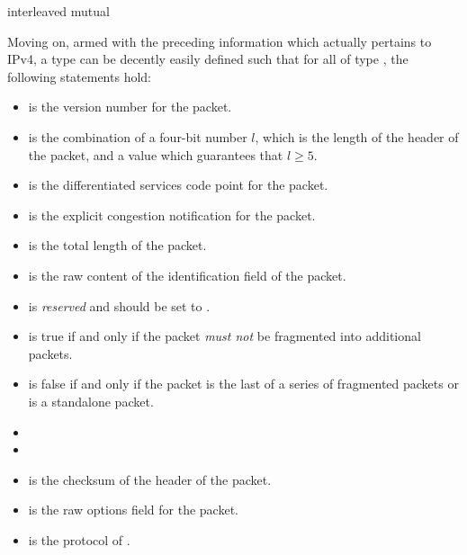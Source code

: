 \documentclass{report}
\begin{document}
\begin{itemize}
\begin{code}
  interleaved mutual
\end{code}

Moving on, armed with the preceding information which actually pertains to IPv4, a type  can be decently easily defined such that for all  of type , the following statements hold:
\begin{itemize}
	\item {}  is the version number for the  packet.
	\item {}  is the combination of a four-bit number \(l\), which is the length of the header of the  packet, and a value which guarantees that \(l \geq 5\).
	\item {}  is the differentiated services code point for the  packet.
	\item {}  is the explicit congestion notification for the  packet.
	\item {}  is the total length of the  packet.
	\item {}  is the raw content of the identification field of the  packet.
	\item {}  is \emph{reserved} and should be set to .
	\item {}  is true if and only if the  packet \emph{must not} be fragmented into additional packets.
	\item {}  is false if and only if the  packet is the last of a series of fragmented packets or is a standalone packet.
	\item {} 
	\item {} 
	\item {}  is the checksum of the header of the  packet.
	\item {}  is the raw options field for the  packet.
	\item {}  is the protocol of  .

\end{itemize}
\end{itemize}
\end{document}
